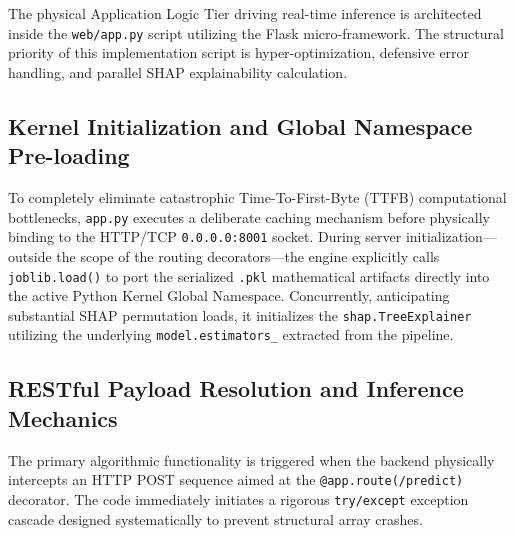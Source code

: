 The physical Application Logic Tier driving real-time inference is
architected inside the \texttt{web/app.py} script utilizing the Flask
micro-framework. The structural priority of this implementation script
is hyper-optimization, defensive error handling, and parallel SHAP
explainability calculation.

\hypertarget{kernel-initialization-and-global-namespace-pre-loading}{%
\subsection{Kernel Initialization and Global Namespace
Pre-loading}\label{kernel-initialization-and-global-namespace-pre-loading}}

To completely eliminate catastrophic Time-To-First-Byte (TTFB)
computational bottlenecks, \texttt{app.py} executes a deliberate caching
mechanism before physically binding to the HTTP/TCP
\texttt{0.0.0.0:8001} socket. During server initialization---outside the
scope of the routing decorators---the engine explicitly calls
\texttt{joblib.load()} to port the serialized \texttt{.pkl} mathematical
artifacts directly into the active Python Kernel Global Namespace.
Concurrently, anticipating substantial SHAP permutation loads, it
initializes the \texttt{shap.TreeExplainer} utilizing the underlying
\texttt{model.estimators\_} extracted from the pipeline.

\hypertarget{restful-payload-resolution-and-inference-mechanics}{%
\subsection{RESTful Payload Resolution and Inference
Mechanics}\label{restful-payload-resolution-and-inference-mechanics}}

The primary algorithmic functionality is triggered when the backend
physically intercepts an HTTP POST sequence aimed at the
\texttt{@app.route(\textquotesingle{}/predict\textquotesingle{})}
decorator. The code immediately initiates a rigorous \texttt{try/except}
exception cascade designed systematically to prevent structural array
crashes.

